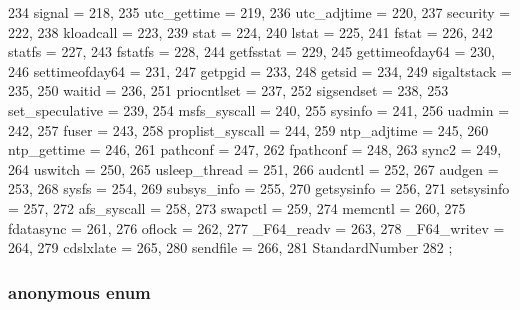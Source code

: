 \begin{DoxyCode}
{234         signal = 218,
235         utc_gettime = 219,
236         utc_adjtime = 220,
237         security = 222,
238         kloadcall = 223,
239         stat = 224,
240         lstat = 225,
241         fstat = 226,
242         statfs = 227,
243         fstatfs = 228,
244         getfsstat = 229,
245         gettimeofday64 = 230,
246         settimeofday64 = 231,
247         getpgid = 233,
248         getsid = 234,
249         sigaltstack = 235,
250         waitid = 236,
251         priocntlset = 237,
252         sigsendset = 238,
253         set_speculative = 239,
254         msfs_syscall = 240,
255         sysinfo = 241,
256         uadmin = 242,
257         fuser = 243,
258         proplist_syscall = 244,
259         ntp_adjtime = 245,
260         ntp_gettime = 246,
261         pathconf = 247,
262         fpathconf = 248,
263         sync2 = 249,
264         uswitch = 250,
265         usleep_thread = 251,
266         audcntl = 252,
267         audgen = 253,
268         sysfs = 254,
269         subsys_info = 255,
270         getsysinfo = 256,
271         setsysinfo = 257,
272         afs_syscall = 258,
273         swapctl = 259,
274         memcntl = 260,
275         fdatasync = 261,
276         oflock = 262,
277         _F64_readv = 263,
278         _F64_writev = 264,
279         cdslxlate = 265,
280         sendfile = 266,
281         StandardNumber
282     };
\end{DoxyCode}
\hypertarget{classSystemCalls_3_01Tru64_01_4_a7859c0a3efa8b1c360f5c2376baf051e}{
\subsubsection[{"@75}]{\setlength{\rightskip}{0pt plus 5cm}anonymous enum}}
\label{classSystemCalls_3_01Tru64_01_4_a7859c0a3efa8b1c360f5c2376baf051e}
